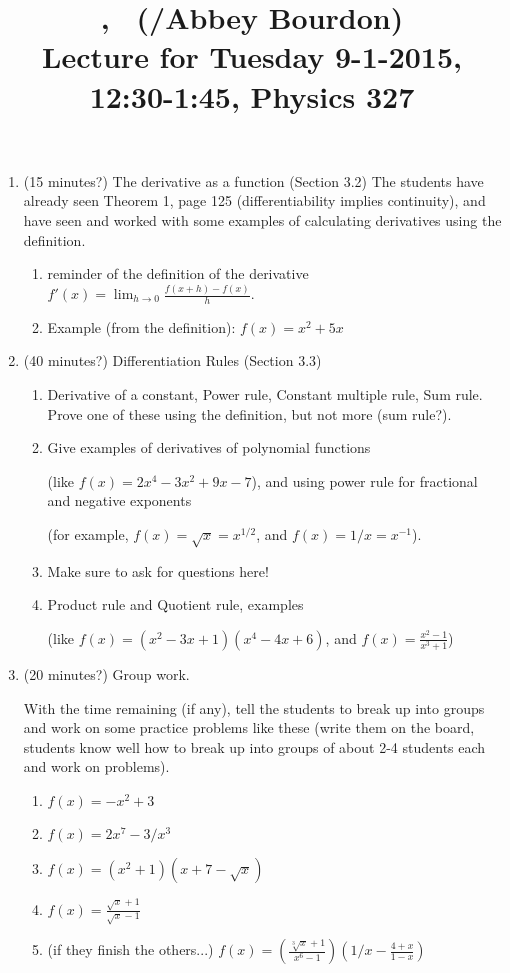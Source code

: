 \documentclass[12pt]{amsart}
\title{\course, \semester\ (\instructor/Abbey Bourdon) \\ Lecture for
Tuesday 9-1-2015, 12:30-1:45, Physics 327}
\begin{document}
\maketitle

\begin{enumerate}[1. ]
\setlength{\itemsep}{1cm}
\item (15 minutes?)
The derivative as a function (Section 3.2)
{\color{blue}The students have already seen Theorem 1, page 125
(differentiability implies continuity), and have seen and worked with
some examples of calculating derivatives using the definition.}
\begin{enumerate}[ i. ]
\item
reminder of the definition of the derivative $\displaystyle f'(x) = \lim_{h
\to 0} \frac{f(x + h) - f(x)}{h}$.
\item
Example (from the definition): $\displaystyle f(x) = {x^2 + 5x}$
\end{enumerate}

\item (40 minutes?)
Differentiation Rules (Section 3.3)
\begin{enumerate}[ i. ]
\item
Derivative of a constant, Power rule, Constant multiple rule, Sum rule.
Prove one of these using the definition, but not more (sum rule?).
\item
Give examples of derivatives of polynomial functions 

(like $f(x) = 2x^4 -
3x^2 + 9x - 7$), and using power rule for fractional and negative exponents

(for example, $f(x) = \sqrt x = x^{1/2}$, and $f(x) = 1/x = x^{-1}$).
\item
Make sure to ask for questions here!
\item
Product rule and Quotient rule, examples 

(like $f(x) = (x^2 - 3x + 1)(x^4 -
4x + 6)$, and 
$\displaystyle f(x) = \frac{x^2 - 1}{x^3 + 1}$)
\end{enumerate}

\item (20 minutes?)
Group work.

With the time remaining (if any), tell the students to break up into groups
and work on some practice problems like these (write them on the board,
students know well how to break up into groups of about 2-4 students each
and work on problems).
\begin{enumerate}[ i. ]
\item
$f(x) = -x^2 + 3$
\item
$f(x) = 2x^7 - 3/x^3$
\item
$f(x) = (x^2 + 1)(x + 7 - \sqrt x)$
\item
$f(x) = \frac{\sqrt x + 1}{\sqrt x - 1}$
\item (if they finish the others...)
$\displaystyle f(x) = \left(\frac{\sqrt[3] x + 1}{x^6 - 1}\right)\left(1/x
- \frac{4 + x}{1 - x}\right)$
\end{enumerate}


\end{enumerate}
\end{document}
